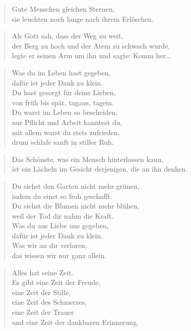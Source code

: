 \documentclass[ngerman,a4paper,11pt]{scrreprt}
\begin{document}
\begin{verse}
Gute Menschen gleichen Sternen, \\
sie leuchten noch lange nach ihrem Erlöschen. \\
\end{verse}

\begin{verse}
Als Gott sah, dass der Weg zu weit, \\
der Berg zu hoch und der Atem zu schwach wurde, \\
legte er seinen Arm um ihn und sagte: Komm her\ldots{} \\
\end{verse}

\begin{verse}
Was du im Leben hast gegeben, \\
dafür ist jeder Dank zu klein. \\
Du hast gesorgt für deine Lieben, \\
von früh bis spät, tagaus, tagein. \\
Du warst im Leben so bescheiden, \\
nur Pflicht und Arbeit kanntest du, \\
mit allem warst du stets zufrieden, \\
drum schlafe sanft in stiller Ruh. \\
\end{verse}

\begin{verse}
Das Schönste, was ein Mensch hinterlassen kann, \\
ist ein Lächeln im Gesicht derjenigen, die an ihn denken. \\
\end{verse}

\begin{verse}
Du siehst den Garten nicht mehr grünen, \\
indem du einst so froh geschafft. \\
Du siehst die Blumen nicht mehr blühen, \\
weil der Tod dir nahm die Kraft. \\
Was du aus Liebe uns gegeben, \\
dafür ist jeder Dank zu klein. \\
Was wir an dir verloren, \\
das wissen wir nur ganz allein. \\
\end{verse}

\begin{verse}
Alles hat seine Zeit. \\
Es gibt eine Zeit der Freude, \\
eine Zeit der Stille, \\
eine Zeit des Schmerzes, \\
eine Zeit der Trauer \\
und eine Zeit der dankbaren Erinnerung. \\
\end{verse}
\end{document}
